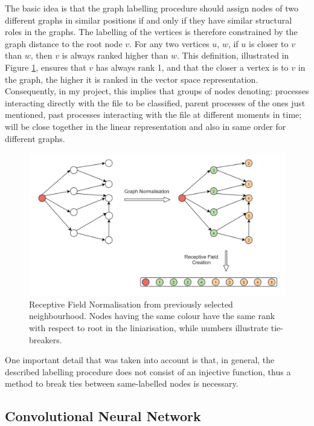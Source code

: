 The basic idea is that the graph labelling procedure should assign nodes of two different graphs in similar positions if and only if they have similar structural roles in the graphs. The labelling of the vertices is therefore constrained by the graph distance to the root node $v$. For any two vertices $u$, $w$, if $u$ is closer to $v$ than $w$, then $v$ is
always ranked higher than $w$. This definition, illustrated in Figure \ref{normalisation}, ensures that $v$ has always rank 1, and that the closer a vertex is to $v$ in the graph, the higher it is ranked in the vector space representation. Consequently, in my project, this implies that groups of nodes denoting: processes interacting directly with the file to be classified, parent processes of the ones just mentioned, past processes interacting with the file at different moments in time; will be close together in the linear representation and also in same order for different graphs.\\

\begin{figure}[H]
  \centering
  \includegraphics[scale=0.55]{Images/normalisation.png}
  \caption{Receptive Field Normalisation from previously selected neighbourhood. Nodes having the same colour have the same rank with respect to root in the liniarisation, while numbers illustrate tie-breakers.}
  \label{normalisation}
\end{figure}

One important detail that was taken into account is that, in general, the described labelling procedure does not consist of an injective function, thus a method to break ties between same-labelled nodes is necessary.

\subsection{Convolutional Neural Network}

